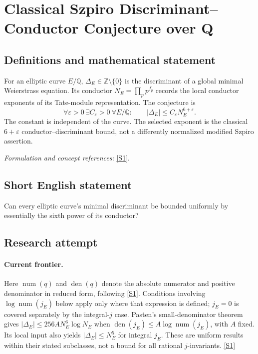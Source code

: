 \documentclass[11pt,a4paper]{article}
\newcommand{\Z}{\mathbb{Z}}
\newcommand{\Q}{\mathbb{Q}}
\newcommand{\sref}[2]{\hyperlink{source:#1:#2}{[S#2]}}
\newif\ifshowcatalogue
\newcommand{\cataloguescope}[1]{\ifshowcatalogue
 \paragraph{Exact scope in the supplied catalogue.}
 \begin{quote}\small #1\end{quote}\fi}
\numberwithin{equation}{section}
\begin{document}
\setcounter{section}{104}
\clearpage
\section{\texorpdfstring{Classical Szpiro Discriminant–Conductor Conjecture over Q}{Classical Szpiro Discriminant–Conductor Conjecture over Q}}\label{105}
\subsection{Definitions and mathematical statement}
For an elliptic curve $E/\Q$, $\Delta_E\in\Z\setminus\{0\}$ is the discriminant of a global minimal Weierstrass equation. Its conductor $N_E=\prod_p p^{f_p}$ records the local conductor exponents of its Tate-module representation. The conjecture is
\[
 \forall\varepsilon>0\ \exists C_\varepsilon>0\ \forall E/\Q:\qquad
 |\Delta_E|\le C_\varepsilon N_E^{6+\varepsilon}.
\]
The constant is independent of the curve. The selected exponent is the classical $6+\varepsilon$ conductor--discriminant bound, not a differently normalized modified Szpiro assertion.
\par\smallskip\textit{Formulation and concept references:} \sref{105}{1}.
\cataloguescope{Prove or disprove that for every epsilon>0 there is C(epsilon)>0 such that every elliptic curve E over Q with minimal discriminant Delta\_E and conductor N\_E satisfies |Delta\_E| <= C(epsilon)*N\_E\textasciicircum{}(6+epsilon).}
\subsection{Short English statement}
Can every elliptic curve's minimal discriminant be bounded uniformly by essentially the sixth power of its conductor?
\subsection{Research attempt}

\paragraph{Current frontier.}
Here $\operatorname{num}(q)$ and $\operatorname{den}(q)$ denote the absolute
numerator and positive denominator in reduced form, following \sref{105}{1}.
Conditions involving $\log\operatorname{num}(j_E)$ below apply only where
that expression is defined; $j_E=0$ is covered separately by the integral-$j$
case.
Pasten's small-denominator theorem gives
$|\Delta_E|\leq256A N_E^6\log N_E$ when
$\operatorname{den}(j_E)\leq A\log\operatorname{num}(j_E)$, with $A$ fixed.
Its local input also yields $|\Delta_E|\leq N_E^5$ for integral $j_E$.
These are uniform results within their stated subclasses, not a bound for
all rational $j$-invariants. \sref{105}{1}
\end{document}
